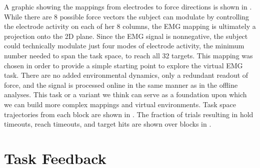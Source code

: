 \documentclass[../main.tex]{subfiles}
\begin{document}
A graphic showing the mappings from electrodes to force directions is shown in . While there are 8 possible force vectors the subject can modulate by controlling the electrode activity on each of her 8 columns, the EMG mapping is ultimately a projection onto the 2D plane. Since the EMG signal is nonnegative, the subject could technically modulate just four modes of electrode activity, the minimum number needed to span the task space, to reach all 32 targets. This mapping was chosen in order to provide a simple starting point to explore the virtual EMG task. There are no added environmental dynamics, only a redundant readout of force, and the signal is processed online in the same manner as in the offline analyses. This task or a variant we think can serve as a foundation upon which we can build more complex mappings and virtual environments. Task space trajectories from each block are shown in . The fraction of trials resulting in hold timeouts, reach timeouts, and target hits are shown over blocks in .





\section{Task Feedback}
\end{document}
